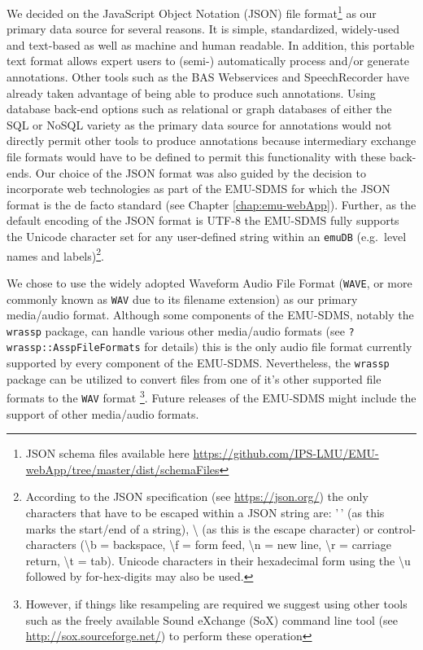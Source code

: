 \documentclass[
]{book}
\begin{document}
We decided on the JavaScript Object Notation (JSON) file format\footnote{JSON schema files available here \url{https://github.com/IPS-LMU/EMU-webApp/tree/master/dist/schemaFiles}} as our primary data source for several reasons. It is simple, standardized, widely-used and text-based as well as machine and human readable. In addition, this portable text format allows expert users to (semi-) automatically process and/or generate annotations. Other tools such as the BAS Webservices \citep{kisler:2012a} and SpeechRecorder \citep{draxler:2004a} have already taken advantage of being able to produce such annotations. Using database back-end options such as relational or graph databases of either the SQL or NoSQL variety as the primary data source for annotations would not directly permit other tools to produce annotations because intermediary exchange file formats would have to be defined to permit this functionality with these back-ends. Our choice of the JSON format was also guided by the decision to incorporate web technologies as part of the EMU-SDMS for which the JSON format is the de facto standard (see Chapter \ref{chap:emu-webApp}). Further, as the default encoding of the JSON format is UTF-8 the EMU-SDMS fully supports the Unicode character set for any user-defined string within an \texttt{emuDB} (e.g.~level names and labels)\footnote{According to the JSON specification (see \url{https://json.org/}) the only characters that have to be escaped within a JSON string are: '\,' (as this marks the start/end of a string), \textbackslash{} (as this is the escape character) or control-characters (\textbackslash b = backspace, \textbackslash f = form feed, \textbackslash n = new line, \textbackslash r = carriage return, \textbackslash t = tab). Unicode characters in their hexadecimal form using the \textbackslash u followed by for-hex-digits may also be used.}.

We chose to use the widely adopted Waveform Audio File Format (\texttt{WAVE}, or more commonly known as \texttt{WAV} due to its filename extension) as our primary media/audio format. Although some components of the EMU-SDMS, notably the \texttt{wrassp} package, can handle various other media/audio formats (see \texttt{?wrassp::AsspFileFormats} for details) this is the only audio file format currently supported by every component of the EMU-SDMS. Nevertheless, the \texttt{wrassp} package can be utilized to convert files from one of it's other supported file formats to the \texttt{WAV} format \footnote{However, if things like resampeling are required we suggest using other tools such as the freely available Sound eXchange (SoX) command line tool (see \url{http://sox.sourceforge.net/}) to perform these operation}. Future releases of the EMU-SDMS might include the support of other media/audio formats.
\end{document}
